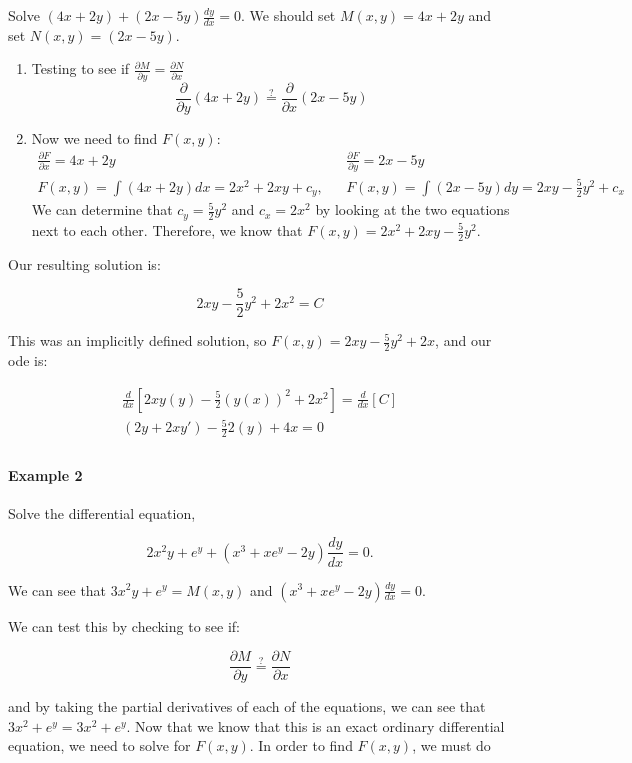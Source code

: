     \begin{problem}
      Solve $(4x+2y)+(2x-5y)\frac{dy}{dx}=0$. We should set $M(x,y)=4x+2y$ and set $N(x,y)=(2x-5y)$.

    \begin{enumerate}
      \item Testing to see if $\frac{\partial M}{\partial y}=\frac{\partial N}{\partial x}$
        \[
          \frac{\partial}{\partial y}(4x+2y)\stackrel{?}{=}\frac{\partial}{\partial x}(2x-5y)
        \]
      \item Now we need to find $F(x,y)$:
        \begin{align*}
          \frac{\partial F}{\partial x}=4x+2y && \frac{\partial F}{\partial y}=2x-5y\\
          F(x,y)=\int(4x+2y)dx=2x^2+2xy+c_y, && F(x,y)=\int(2x-5y)dy=2xy-\frac{5}{2}y^2+c_x
        \end{align*}
        We can determine that $c_y=\frac{5}{2}y^2$ and $c_x=2x^2$ by looking at the two equations next to each other. Therefore, we know that $F(x,y)=2x^2+2xy-\frac{5}{2}y^2$.
    \end{enumerate}
    Our resulting solution is:

    \[
      \boxed{2xy-\frac{5}{2}y^2+2x^2=C}
    \]

    This was an implicitly defined solution, so $F(x,y)=2xy-\frac{5}{2}y^2+2x$, and our ode is:
    
    \begin{align*}
      \frac{d}{dx}\left[2xy(y)-\frac{5}{2}(y(x))^2+2x^2\right]=\frac{d}{dx}[C]\\
      (2y+2xy')-\frac{5}{2}2(y)+4x=0\\
    \end{align*}

    \paragraph{Example 2} Solve the differential equation,
    
    \[
      2x^2y+e^y+(x^3+xe^y-2y)\frac{dy}{dx}=0. 
    \]

    We can see that $3x^2y+e^y = M(x,y)$ and $(x^3+xe^y-2y)\frac{dy}{dx}=0$.

    We can test this by checking to see if:
    
    \[
      \frac{\partial M}{\partial y}\stackrel{?}{=}\frac{\partial N}{\partial x}
    \]

    and by taking the partial derivatives of each of the equations, we can see that $3x^2+e^y=3x^2+e^y$. Now that we know that this is an exact ordinary differential equation, we need to solve for $F(x,y)$. In order to find $F(x,y)$, we must do 


\end{problem}
